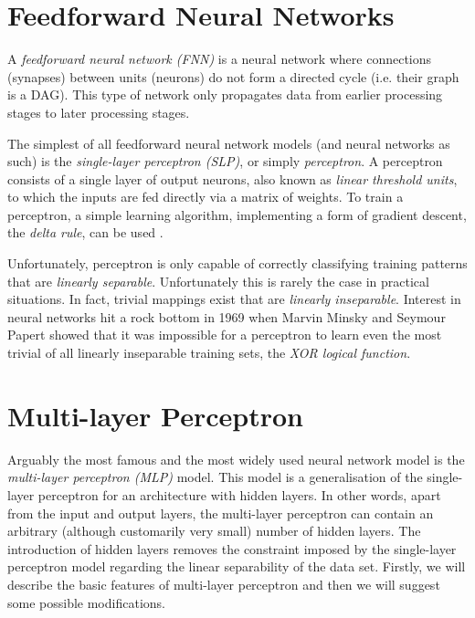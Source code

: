 \section{Feedforward Neural Networks}

A \textit{feedforward neural network (FNN)} is a neural network where connections (synapses) between units (neurons) do not form a directed cycle (i.e. their graph is a DAG). This type of network only propagates data from earlier processing stages to later processing stages.

The simplest of all feedforward neural network models (and neural networks as such) is the \textit{single-layer perceptron (SLP)}, or simply \textit{perceptron}.  A perceptron consists of a single layer of output neurons, also known as \textit{linear threshold units}, to which the inputs are fed directly via a matrix of weights. To train a perceptron, a simple learning algorithm, implementing a form of gradient descent, the \textit{delta rule}, can be used \cite{Wikipedia-Feedforward_neural_network}.

Unfortunately, perceptron is only capable of correctly classifying training patterns that are \textit{linearly separable}. Unfortunately this is rarely the case in practical situations. In fact, trivial mappings exist that are \textit{linearly inseparable}. Interest in neural networks hit a rock bottom in 1969 when Marvin Minsky and Seymour Papert showed that it was impossible for a perceptron to learn even the most trivial of all linearly inseparable training sets, the \textit{XOR logical function}.

\section{Multi-layer Perceptron}

Arguably the most famous and the most widely used neural network model is the \textit{multi-layer perceptron (MLP)} model. This model is a generalisation of the single-layer perceptron for an architecture with hidden layers. In other words, apart from the input and output layers, the multi-layer perceptron can contain an arbitrary (although customarily very small) number of hidden layers. The introduction of hidden layers removes the constraint imposed by the single-layer perceptron model regarding the linear separability of the data set. Firstly, we will describe the basic features of multi-layer perceptron and then we will suggest some possible modifications.  


